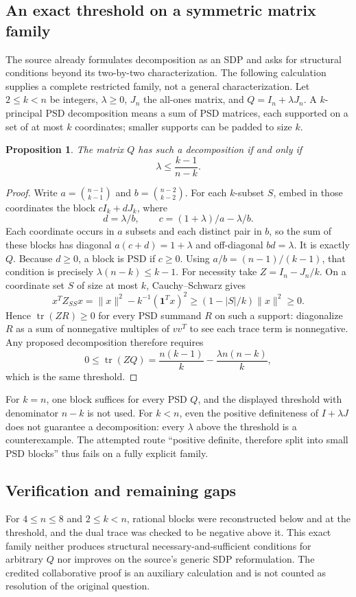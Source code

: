 \documentclass[11pt]{article}
\newtheorem{proposition}{Proposition}
\begin{document}
\subsection{An exact threshold on a symmetric matrix family}
The source already formulates decomposition as an SDP and asks for structural conditions beyond its two-by-two characterization. The following calculation supplies a complete restricted family, not a general characterization. Let $2\le k<n$ be integers, $\lambda\ge0$, $J_n$ the all-ones matrix, and $Q=I_n+\lambda J_n$. A $k$-principal PSD decomposition means a sum of PSD matrices, each supported on a set of at most $k$ coordinates; smaller supports can be padded to size $k$.
\begin{proposition}
The matrix $Q$ has such a decomposition if and only if
\[
\lambda\le\frac{k-1}{n-k}.
\]
\end{proposition}
\begin{proof}
Write $a=\binom{n-1}{k-1}$ and $b=\binom{n-2}{k-2}$. For each $k$-subset $S$, embed in those coordinates the block $cI_k+dJ_k$, where
\[
d=\lambda/b,\qquad c=(1+\lambda)/a-\lambda/b.
\]
Each coordinate occurs in $a$ subsets and each distinct pair in $b$, so the sum of these blocks has diagonal $a(c+d)=1+\lambda$ and off-diagonal $bd=\lambda$. It is exactly $Q$. Because $d\ge0$, a block is PSD if $c\ge0$. Using $a/b=(n-1)/(k-1)$, that condition is precisely $\lambda(n-k)\le k-1$.
For necessity take $Z=I_n-J_n/k$. On a coordinate set $S$ of size at most $k$, Cauchy--Schwarz gives
\[
x^TZ_{SS}x=\|x\|^2-k^{-1}(\mathbf1^Tx)^2\ge(1-|S|/k)\|x\|^2\ge0.
\]
Hence $\operatorname{tr}(ZR)\ge0$ for every PSD summand $R$ on such a support: diagonalize $R$ as a sum of nonnegative multiples of $vv^T$ to see each trace term is nonnegative. Any proposed decomposition therefore requires
\[
0\le\operatorname{tr}(ZQ)=\frac{n(k-1)}k-\frac{\lambda n(n-k)}k,
\]
which is the same threshold.
\end{proof}
For $k=n$, one block suffices for every PSD $Q$, and the displayed threshold with denominator $n-k$ is not used. For $k<n$, even the positive definiteness of $I+\lambda J$ does not guarantee a decomposition: every $\lambda$ above the threshold is a counterexample. The attempted route ``positive definite, therefore split into small PSD blocks'' thus fails on a fully explicit family.
\subsection{Verification and remaining gaps}
For $4\le n\le8$ and $2\le k<n$, rational blocks were reconstructed below and at the threshold, and the dual trace was checked to be negative above it. This exact family neither produces structural necessary-and-sufficient conditions for arbitrary $Q$ nor improves on the source's generic SDP reformulation. The credited collaborative proof is an auxiliary calculation and is not counted as resolution of the original question.
\end{document}
